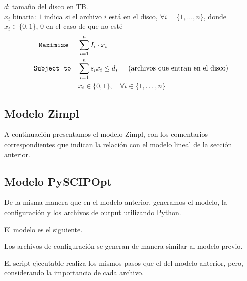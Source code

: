 \documentclass[11pt, a4paper, pdftex]{article}
\begin{document}
$d$: tamaño del disco en TB. \\ 

$x_{i}$ binaria: $1$ indica si el archivo $i$ está en el disco, $\forall i = \{1, \ldots, n\}$, donde $x_{i} \in \{0, 1\}$, $0$ en el caso de que no esté\\

\begin{alignat*}{2}
	\texttt{Maximize}\quad\,\,
	& \sum_{i = 1}^{n} I_{i} \cdot x_{i}\\
	\texttt{Subject to}\quad
	& \sum_{i = 1}^{n} s_{i} x_{i} \le d,\ \quad\text{(archivos que entran en el disco)}\\
	& x_{i} \in \{0,1\}, \quad \forall i \in \{1, \ldots, n\}
\end{alignat*}

\newpage
\subsection{Modelo Zimpl}

A continuación presentamos el modelo Zimpl, con los comentarios correspondientes que indican la relación con el modelo lineal de la sección anterior.



\newpage
\subsection{Modelo PySCIPOpt}

De la misma manera que en el modelo anterior, generamos el modelo, la configuración y los 
archivos de output utilizando Python.

El modelo es el siguiente.



\newpage

Los archivos de configuración se generan de manera similar al modelo previo.



\newpage

El script ejecutable realiza los mismos pasos que el del modelo anterior, pero, considerando 
la importancia de cada archivo.



\newpage
\end{document}
